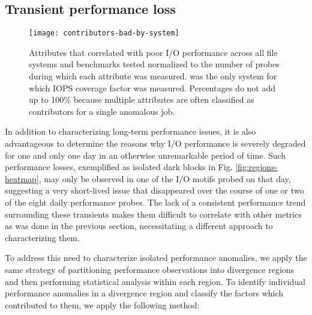 \subsection{Transient performance loss} \label{sec:results/shortterm}


\begin{figure}

    \centering
    \texttt{[image: contributors-bad-by-system]}
    \vspace{-.35in}
    \caption{Attributes that correlated with poor I/O performance across all file systems and benchmarks tested normalized to the number of probes during which each attribute was measured.
    \mira was the only system for which IOPS coverage factor was measured.
    Percentages do not add up to 100\% because multiple attributes are often classified as contributors for a single anomalous job.
    }
    \label{fig:contributors-bad-by-system}
\end{figure}

In addition to characterizing long-term performance issues, it is also advantageous to determine the reasons why I/O performance is severely degraded for one and only one day in an otherwise unremarkable period of time.
Such performance losses, exemplified as isolated dark blocks in Fig. \ref{fig:regions-heatmap}, may only be observed in one of the I/O motifs probed on that day, suggesting a very short-lived issue that disappeared over the course of one or two of the eight daily performance probes.
The lack of a consistent performance trend surrounding these transients makes them difficult to correlate with other metrics as was done in the previous section, necessitating a different approach to characterizing them.

To address this need to characterize isolated performance anomalies, we apply the same strategy of partitioning performance observations into divergence regions and then performing statistical analysis within each region.
To identify individual performance anomalies in a divergence region and classify the factors which contributed to them, we apply the following method:

